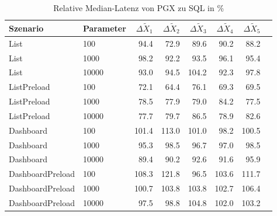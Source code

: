 
\begin{table}[ht]
\setlength{\extrarowheight}{-1pt}
\centering
\caption{Relative Median-Latenz von PGX zu SQL in \%}
\begin{tabular}{llrrrrrr}
\toprule
Szenario & Parameter & ${\Delta \tilde{X}_1}$ & ${\Delta \tilde{X}_2}$ & ${\Delta \tilde{X}_3}$ & ${\Delta \tilde{X}_4}$ & ${\Delta \tilde{X}_5}$ \\
\midrule
	List & 100 & \cellcolor{green!12}  94.4 & \cellcolor{green!21}  72.9 & \cellcolor{green!14}  89.6 & \cellcolor{green!14}  90.2 & \cellcolor{green!15}  88.2 \\
	List & 1000 &  98.2 & \cellcolor{green!13}  92.2 & \cellcolor{green!13}  93.5 & \cellcolor{green!12}  96.1 & \cellcolor{green!12}  95.4 \\
	List & 10000 & \cellcolor{green!13}  93.0 & \cellcolor{green!12}  94.5 & \cellcolor{red!12}  104.2 & \cellcolor{green!13}  92.3 & \cellcolor{green!11}  97.8 \\
	ListPreload & 100 & \cellcolor{green!21}  72.1 & \cellcolor{green!24}  64.4 & \cellcolor{green!20}  76.1 & \cellcolor{green!22}  69.3 & \cellcolor{green!22}  69.5 \\
	ListPreload & 1000 & \cellcolor{green!19}  78.5 & \cellcolor{green!19}  77.9 & \cellcolor{green!18}  79.0 & \cellcolor{green!16}  84.2 & \cellcolor{green!19}  77.5 \\
	ListPreload & 10000 & \cellcolor{green!19}  77.7 & \cellcolor{green!18}  79.7 & \cellcolor{green!15}  86.5 & \cellcolor{green!18}  78.9 & \cellcolor{green!17}  82.6 \\
	Dashboard & 100 &  101.4 & \cellcolor{red!15}  113.0 &  101.0 &  98.2 &  100.5 \\
	Dashboard & 1000 & \cellcolor{green!12}  95.3 &  98.5 & \cellcolor{green!11}  96.7 & \cellcolor{green!11}  97.0 &  98.5 \\
	Dashboard & 10000 & \cellcolor{green!14}  89.4 & \cellcolor{green!14}  90.2 & \cellcolor{green!13}  92.6 & \cellcolor{green!13}  91.6 & \cellcolor{green!12}  95.9 \\
	DashboardPreload & 100 & \cellcolor{red!13}  108.3 & \cellcolor{red!19}  121.8 & \cellcolor{green!11}  96.5 & \cellcolor{red!11}  103.6 & \cellcolor{red!15}  111.7 \\
	DashboardPreload & 1000 &  100.7 & \cellcolor{red!12}  103.8 & \cellcolor{red!12}  103.8 & \cellcolor{red!11}  102.7 & \cellcolor{red!13}  106.4 \\
	DashboardPreload & 10000 & \cellcolor{green!11}  97.5 &  98.8 & \cellcolor{red!12}  104.8 & \cellcolor{red!11}  102.0 & \cellcolor{red!11}  103.2 \\
\bottomrule
\end{tabular}
\label{tab:relativer_durchsatz_pgx}
\end{table}
	